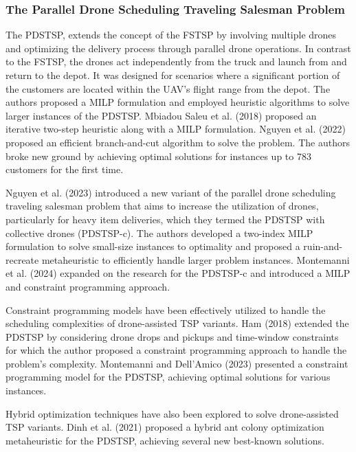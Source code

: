 \documentclass{article}
\begin{document}
	\subsubsection{The Parallel Drone Scheduling Traveling Salesman Problem}
	 The PDSTSP, extends the concept of the FSTSP by involving multiple drones and optimizing the delivery process through parallel drone operations. In contrast to the FSTSP, the drones act independently from the truck and launch from and return to the depot. It was designed for scenarios where a significant portion of the customers are located within the UAV's flight range from the depot. The authors proposed a  MILP formulation and employed heuristic algorithms to solve larger instances of the PDSTSP. Mbiadou Saleu et al. (2018) proposed an iterative two-step heuristic along with a MILP formulation. Nguyen et al. (2022) proposed an efficient branch-and-cut algorithm to solve the problem. The authors broke new ground by achieving optimal solutions for instances up to 783 customers for the first time.
	\par 
	Nguyen et al. (2023) introduced a new variant of the parallel drone scheduling traveling salesman problem that aims to increase the utilization of drones, particularly for heavy item deliveries, which they termed the PDSTSP with collective drones (PDSTSP-c).
	The authors developed a two-index MILP formulation to solve small-size instances to optimality and proposed a ruin-and-recreate metaheuristic to efficiently handle larger problem instances. Montemanni et al. (2024) expanded on the research for the PDSTSP-c and introduced a MILP and constraint programming approach.
	\par 
	Constraint programming models have been effectively utilized to handle the scheduling complexities of drone-assisted TSP variants. Ham (2018) extended the PDSTSP by considering drone drops and pickups and time-window constraints for which the author proposed a constraint programming approach to handle the problem's complexity. Montemanni and Dell’Amico (2023) presented a constraint programming model for the PDSTSP, achieving optimal solutions for various instances.
	\par 
	Hybrid optimization techniques have also been explored to solve drone-assisted TSP variants. Dinh et al. (2021) proposed a hybrid ant colony optimization metaheuristic for the PDSTSP, achieving several new best-known solutions. 
\end{document}

